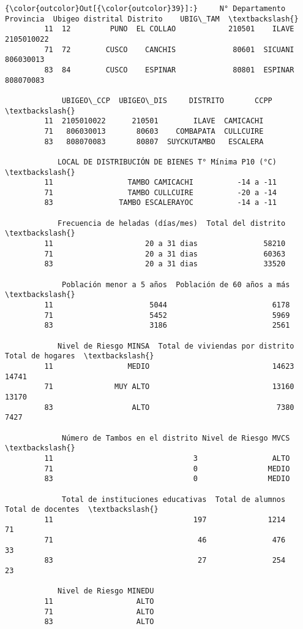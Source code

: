 \documentclass[11pt]{article}
\begin{document}
\begin{Verbatim}[commandchars=\\\{\}]
{\color{outcolor}Out[{\color{outcolor}39}]:}     N° Departamento  Provincia  Ubigeo distrital Distrito    UBIG\_TAM  \textbackslash{}
         11  12         PUNO  EL COLLAO            210501    ILAVE  2105010022   
         71  72        CUSCO    CANCHIS             80601  SICUANI   806030013   
         83  84        CUSCO    ESPINAR             80801  ESPINAR   808070083   
         
             UBIGEO\_CCP  UBIGEO\_DIS     DISTRITO       CCPP  \textbackslash{}
         11  2105010022      210501        ILAVE  CAMICACHI   
         71   806030013       80603    COMBAPATA  CULLCUIRE   
         83   808070083       80807  SUYCKUTAMBO   ESCALERA   
         
            LOCAL DE DISTRIBUCIÓN DE BIENES T° Mínima P10 (°C)  \textbackslash{}
         11                 TAMBO CAMICACHI          -14 a -11   
         71                 TAMBO CULLCUIRE          -20 a -14   
         83               TAMBO ESCALERAYOC          -14 a -11   
         
            Frecuencia de heladas (días/mes)  Total del distrito  \textbackslash{}
         11                     20 a 31 dias               58210   
         71                     20 a 31 dias               60363   
         83                     20 a 31 dias               33520   
         
             Población menor a 5 años  Población de 60 años a más  \textbackslash{}
         11                      5044                        6178   
         71                      5452                        5969   
         83                      3186                        2561   
         
            Nivel de Riesgo MINSA  Total de viviendas por distrito  Total de hogares  \textbackslash{}
         11                 MEDIO                            14623             14741   
         71              MUY ALTO                            13160             13170   
         83                  ALTO                             7380              7427   
         
             Número de Tambos en el distrito Nivel de Riesgo MVCS  \textbackslash{}
         11                                3                 ALTO   
         71                                0                MEDIO   
         83                                0                MEDIO   
         
             Total de instituciones educativas  Total de alumnos  Total de docentes  \textbackslash{}
         11                                197              1214                 71   
         71                                 46               476                 33   
         83                                 27               254                 23   
         
            Nivel de Riesgo MINEDU  
         11                   ALTO  
         71                   ALTO  
         83                   ALTO  
\end{Verbatim}
            
\end{document}
